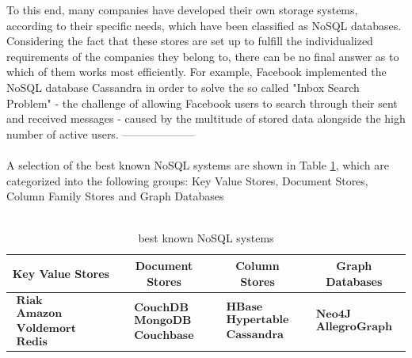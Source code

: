 To this end, many companies have developed their own storage systems, according to their specific needs, which have been classified as \ac{NoSQL} databases. Considering the fact that these stores are set up to fulfill the individualized requirements of the companies they belong to, there can be no final answer as to which of them  works most efficiently. For example, Facebook implemented the \ac{NoSQL} database Cassandra in order to solve the so called "Inbox Search Problem" - the challenge of allowing Facebook users to search through their sent and received messages - caused by the multitude of stored data alongside the high number of active users. 
--------------------
\\
\\
A selection of the best known \ac{NoSQL} systems are shown in Table \ref{tbl:nosql_sys}, which are categorized into the following groups: Key Value Stores, Document Stores, Column Family Stores and  Graph Databases
\\
\\
\begin{table}[htb]
\begin{tabular}{|c|c|c|c|}
\hline 
\textbf{Key Value Stores} & \textbf{Document Stores} & \textbf{Column Stores} & \textbf{Graph Databases} \\ 
\hline 
$\begin{array}{l} \textbf{Riak} \\ \textbf{Amazon SimpleDB} \\ \textbf{Voldemort}\\  \textbf{Redis} \end{array}$ & 
$\begin{array}{l} \textbf{CouchDB} \\ \textbf{MongoDB} \\ \textbf{Couchbase} \end{array}$ & 
$\begin{array}{l} \textbf{HBase} \\ \textbf{Hypertable} \\ \textbf{Cassandra}  \end{array}$  & 
$\begin{array}{l} \textbf{Neo4J} \\ \textbf{AllegroGraph}   \end{array}$ \\ 
\hline 
\end{tabular}
\caption{best known \ac{NoSQL} systems}
\label{tbl:nosql_sys}
\end{table}
\\
\\

